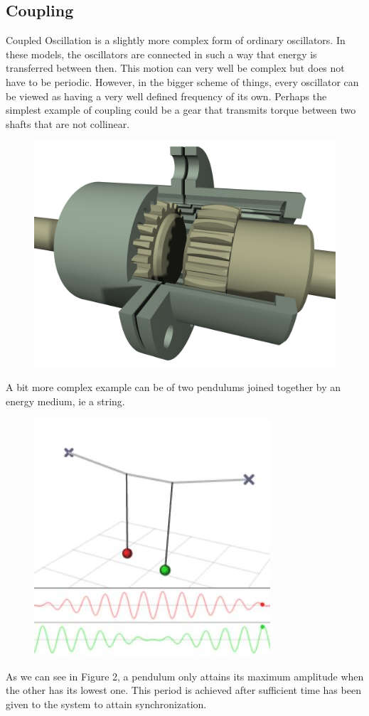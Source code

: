 \subsection{Coupling}
Coupled Oscillation is a slightly more complex form of ordinary oscillators. In these models, the oscillators are connected in such a way that energy is transferred between then. This motion can very well be complex but does not have to be periodic. However, in the bigger scheme of things, every oscillator can be viewed as having a very well defined frequency of its own. Perhaps the simplest example of coupling could be a gear that transmits torque between two shafts that are not collinear. 
\begin{figure}[h!]
  \centering
  \includegraphics[width=0.5\linewidth]{imgs/gear}
  \caption{}
  \label{fig:intro_gear}
\end{figure}
A bit more complex example can be of two pendulums joined together by an energy medium, ie a string.
\begin{figure}[h!]
\centering
\includegraphics[width=0.5\linewidth]{imgs/couple}
\caption{}
\label{fig:intro_couple}
\end{figure}

As we can see in Figure 2, a pendulum only attains its maximum amplitude when the other has its lowest one. This period is achieved after sufficient time has been given to the system to attain synchronization.  

